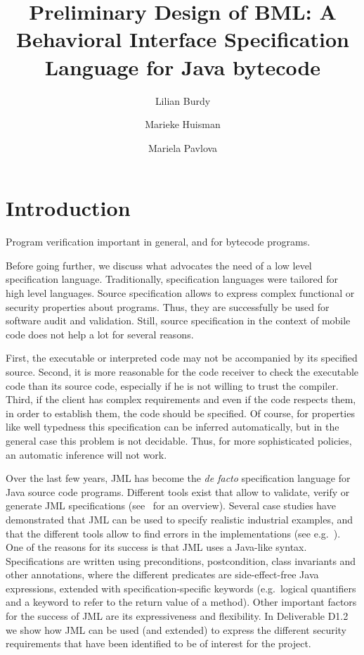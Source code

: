\documentclass[a4paper]{llncs}
\title{Preliminary Design of BML: A Behavioral Interface Specification 
Language for Java bytecode}
\author{
  Lilian Burdy
\and 
  Marieke Huisman
\and
  Mariela Pavlova}
\institute{
  INRIA Sophia Antipolis, France \\ 
  \email{Lilian.Burdy@sophia.inria.fr, 
         Marieke.Huisman@sophia.inria.fr,
         Mariela.Pavlova@sophia.inria.fr}
}
\begin{document}
\maketitle


\begin{abstract}
\end{abstract}



\section{Introduction}
\label{IntroSectLab}
Program verification important in general, and for bytecode programs.

Before going further, we discuss what advocates the need of a low
level specification language.  Traditionally, specification languages
were tailored for high level languages.  Source specification allows
to express complex functional or security properties about programs.
Thus, they are successfully be used for software audit and
validation. Still, source specification in the context of mobile code
does not help a lot for several reasons.


First, the executable or interpreted code may not be accompanied by
its specified source. Second, it is more reasonable for the code
receiver to check the executable code than its source code, especially
if he is not willing to trust the compiler. Third, if the client has
complex requirements and even if the code respects them, in order to
establish them, the code should be specified. Of course, for
properties like well typedness this specification can be inferred
automatically, but in the general case this problem is not
decidable. Thus, for more sophisticated policies, an automatic
inference will not work.


Over the last few years, JML has become the \emph{de facto}
specification language for Java source code programs. Different tools
exist that allow to validate, verify or generate JML specifications
(see~\cite{BurdyCCEKLLP05} for an overview). Several case
studies have demonstrated that JML can be used to specify realistic
industrial examples, and that the different tools allow to find errors
in the implementations (see e.g.~\cite{BreunesseCHJ04}). One
of the reasons for its success is that JML uses a Java-like
syntax. Specifications are written using preconditions, postcondition,
class invariants and other annotations, where the different predicates
are side-effect-free Java expressions, extended with
specification-specific keywords (e.g.~logical quantifiers and a
keyword to refer to the return value of a method). Other important
factors for the success of JML are its expressiveness and
flexibility. In Deliverable D1.2 we show how JML can be used (and
extended) to express the different security requirements that have
been identified to be of interest for the project.
\end{document}

